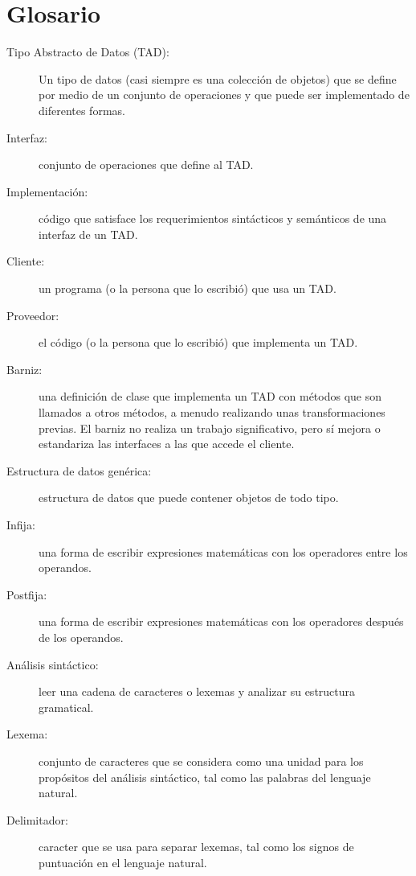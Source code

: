 \section{Glosario}

    
  
\begin{description}
\item [{Tipo Abstracto de Datos (TAD):}] Un tipo de datos (casi siempre
es una colección de objetos) que se define por medio de un conjunto
de operaciones y que puede ser implementado de diferentes formas.
\item [{Interfaz:}] conjunto de operaciones que define al TAD.
\item [{Implementación:}] código que satisface los requerimientos sintácticos
y semánticos de una interfaz de un TAD.
\item [{Cliente:}] un programa (o la persona que lo escribió) que usa un
TAD.
\item [{Proveedor:}] el código (o la persona que lo escribió) que implementa
un TAD.
\item [{Barniz:}] una definición de clase que implementa un TAD con métodos
que son llamados a otros métodos, a menudo realizando unas transformaciones
previas. El barniz no realiza un trabajo significativo, pero sí mejora
o estandariza las interfaces a las que accede el cliente.
\item [{Estructura de datos genérica:}] estructura de datos que puede
contener objetos de todo tipo.
\item [{Infija:}] una forma de escribir expresiones matemáticas con los
operadores entre los operandos.
\item [{Postfija:}] una forma de escribir expresiones matemáticas con los
operadores después de los operandos.
\item [{Análisis sintáctico:}] leer una cadena de caracteres o lexemas
y analizar su estructura gramatical.
\item [{Lexema:}] conjunto de caracteres que se considera como una unidad
para los propósitos del análisis sintáctico, tal como las palabras
del lenguaje natural.
\item [{Delimitador:}] caracter que se usa para separar lexemas, tal como
los signos de puntuación en el lenguaje natural.
\end{description}

